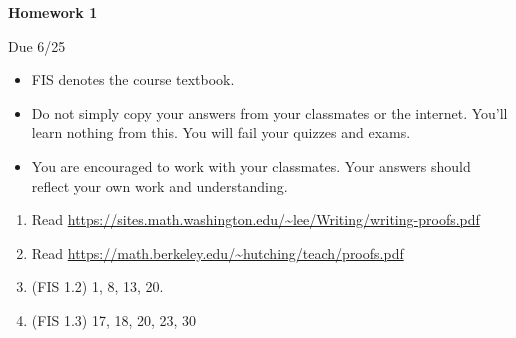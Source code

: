 \documentclass{article}
\begin{document}
\begin{center}
    {\bf Homework 1}
    
    Due 6/25
\end{center}

\begin{itemize}
    \item 
        FIS denotes the course textbook.
    \item
        Do not simply copy your answers from your classmates or the internet.
        You'll learn nothing from this. You will fail your quizzes and exams.
    \item
        You are encouraged to work with your classmates. Your answers
        should reflect your own work and understanding.
\end{itemize}

\begin{enumerate}
    \item
        Read
        \url{https://sites.math.washington.edu/~lee/Writing/writing-proofs.pdf}
    \item
        Read \url{https://math.berkeley.edu/~hutching/teach/proofs.pdf}
    \item
        (FIS 1.2) 1, 8, 13, 20.
    \item
        (FIS 1.3) 17, 18, 20, 23, 30
\end{enumerate}
    
\end{document}
